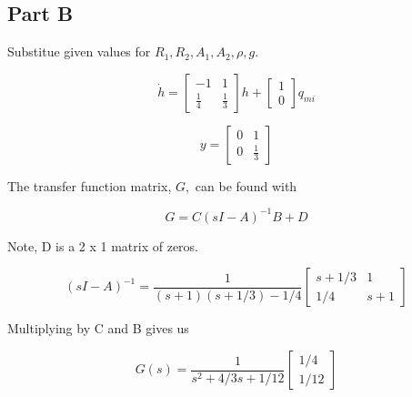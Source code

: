 \documentclass[12pt]{article}
\numberwithin{equation}{subsection}
\newcommand\ddfrac[2]{\frac{\displaystyle #1}{\displaystyle #2}}
\begin{document}
  \subsection{Part B}

  Substitue given values for $ R_1, R_2, A_1, A_2, \rho, g. $

  \begin{equation}
    \dot h =
    \begin{bmatrix}
      -1 & 1 \\
      \ddfrac{1}{4} & \ddfrac{1}{3}
    \end{bmatrix} h +
    \begin{bmatrix}
      1 \\ 0
    \end{bmatrix} q_{mi}
  \end{equation}

  \begin{equation}
    y =
    \begin{bmatrix}
      0 & 1 \\
      0 & \ddfrac{1}{3}
    \end{bmatrix}
  \end{equation}

  The transfer function matrix, $ G, $ can be found with

  \begin{equation}
    G = C(sI - A)^{-1}B + D
  \end{equation}

  Note, D is a 2 x 1 matrix of zeros.

  \begin{equation}
    (sI - A)^{-1} = \frac{1}{(s + 1)(s + 1/3) - 1/4}
    \begin{bmatrix}
      s + 1/3 & 1 \\
      1/4 & s + 1
    \end{bmatrix}
  \end{equation}

  Multiplying by C and B gives us

  \begin{equation}
    G(s) = \frac{1}{s ^2 + 4/3s + 1/12}
    \begin{bmatrix}
      1/4 \\ 1/12
    \end{bmatrix}
  \end{equation}

  \section{}
\end{document}
